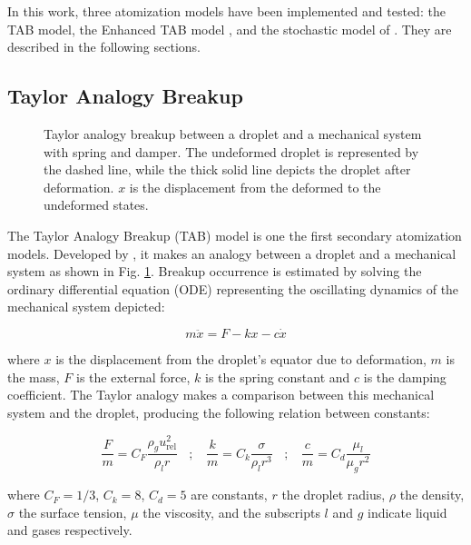 In this work, three atomization models have been implemented and tested: the TAB model, the Enhanced TAB model , and the stochastic model of . They are described in the following sections.

\subsection{Taylor Analogy Breakup}


\begin{figure}[h!]
	\centering
	\caption{Taylor analogy breakup between a droplet and a mechanical system with spring and damper. The undeformed droplet is represented by the dashed line, while the thick solid line depicts the droplet after deformation. $x$ is the displacement from the deformed to the undeformed states.}
	\label{fig:TAB_droplet_deformation}
\end{figure}

The Taylor Analogy Breakup (TAB) model is one the first secondary atomization models. Developed by , it makes an analogy between a droplet and a mechanical system as shown in Fig. \ref{fig:TAB_droplet_deformation}. Breakup occurrence is estimated by solving the ordinary differential equation (ODE) representing the oscillating dynamics of the mechanical system depicted:

\begin{equation}
\label{eq:TAB_ODE_x}
m \ddot{x} = F - k x - c \dot{x}
\end{equation}

where $x$ is the displacement from the droplet's equator due to deformation, $m$ is the mass, $F$ is the external force, $k$ is the spring constant and $c$ is the damping coefficient. The Taylor analogy makes a comparison between this mechanical system and the droplet, producing the following relation between constants:

\begin{equation}
\frac{F}{m} = C_F \frac{\rho_g u_\mathrm{rel}^2}{\rho_l r} ~~~~ ; ~~~~ \frac{k}{m} = C_k \frac{\sigma}{\rho_l r^3} ~~~~ ; ~~~~ \frac{c}{m} = C_d \frac{\mu_l}{\mu_g r^2}
\end{equation}

where $C_F = 1/3$, $C_k = 8$, $C_d = 5$ are constants, $r$ the droplet radius, $\rho$ the density, $\sigma$ the surface tension, $\mu$ the viscosity, and the subscripts $l$ and $g$ indicate liquid and gases respectively. 


